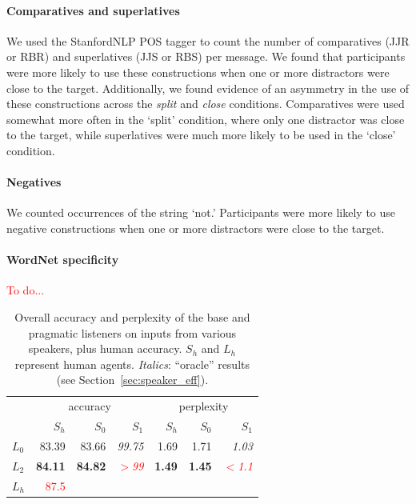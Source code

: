 \documentclass[11pt,letterpaper]{article}
\newcommand{\Listener}{L}
\newcommand{\Speaker}{S}
\renewcommand{\|}{\mid}
\newcommand{\best}[1]{\textbf{#1}}
\newcommand{\oracle}[1]{\textit{#1}}
\newcommand{\secref}[1]{Section~\ref{#1}}
\newcommand{\todocheck}[1]{\textcolor{red}{#1}}
\begin{document}
\paragraph{Comparatives and superlatives} We used the StanfordNLP POS tagger to count the number of comparatives (JJR or RBR) and superlatives (JJS or RBS) per message. We found that participants were more likely to use these constructions when one or more distractors were close to the target. Additionally, we found evidence of an asymmetry in the use of these constructions across the \emph{split} and \emph{close} conditions. Comparatives were used somewhat more often in the `split' condition, where only one distractor was close to the target, while superlatives were much more likely to be used in the `close' condition.

\paragraph{Negatives} We counted occurrences of the string `not.' Participants were more likely to use negative constructions when one or more distractors were close to the target.

\paragraph{WordNet specificity} \todocheck{To do...} \cite{Fellbaum1998}

\begin{table}[t]
\centering
\begin{tabular}{lrrrrrr}
  \hline
   & \multicolumn{3}{c}{accuracy} & \multicolumn{3}{c}{perplexity} \\
   & $\Speaker_h$ & $\Speaker_0$ & $\Speaker_1$ & $\Speaker_h$ & $\Speaker_0$ & $\Speaker_1$ \\
  \hline
  $\Listener_0$ & 83.39 & 83.66 & \oracle{99.75} & 1.69 & 1.71 & \oracle{1.03} \\
  $\Listener_2$ & \best{84.11} & \best{84.82} & \oracle{\todocheck{$>$99}} & \best{1.49} & \best{1.45} & \oracle{\todocheck{$<$1.1}} \\
  \hline
  $\Listener_h$ & \todocheck{87.5} \\
   \hline
\end{tabular}
\caption{Overall accuracy and perplexity of the base and pragmatic listeners
on inputs from various speakers, plus human accuracy. $\Speaker_h$ and $\Listener_h$
represent human agents. \oracle{Italics}: ``oracle'' results (see \secref{sec:speaker_eff}).}
\label{table:speakerVsListener}
\end{table}
\end{document}
